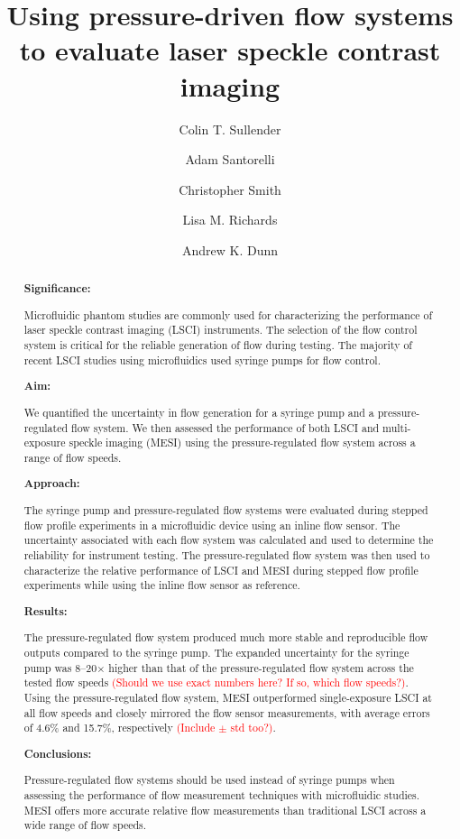 \documentclass[12pt]{spieman}
\title{Using pressure-driven flow systems to evaluate laser speckle contrast imaging}
\author[a]{Colin T. Sullender}
\author[a]{Adam Santorelli}
\author[a]{Christopher Smith}
\author[a]{Lisa M. Richards}
\author[a,*]{Andrew K. Dunn}
\affil[a]{Department of Biomedical Engineering, The University of Texas at Austin, Austin, TX, 78712, USA}
\newcommand{\abstractsection}[1]{
  \par\addvspace{.5\baselineskip}
  \noindent\textbf{#1: }\ignorespaces
}
\begin{document}
\maketitle


\begin{abstract}

\abstractsection{Significance}
Microfluidic phantom studies are commonly used for characterizing the performance of laser speckle contrast imaging (LSCI) instruments. The selection of the flow control system is critical for the reliable generation of flow during testing. The majority of recent LSCI studies using microfluidics used syringe pumps for flow control.

\abstractsection{Aim}
We quantified the uncertainty in flow generation for a syringe pump and a pressure-regulated flow system. We then assessed the performance of both LSCI and multi-exposure speckle imaging (MESI) using the pressure-regulated flow system across a range of flow speeds.

\abstractsection{Approach}
The syringe pump and pressure-regulated flow systems were evaluated during stepped flow profile experiments in a microfluidic device using an inline flow sensor. The uncertainty associated with each flow system was calculated and used to determine the reliability for instrument testing. The pressure-regulated flow system was then used to characterize the relative performance of LSCI and MESI during stepped flow profile experiments while using the inline flow sensor as reference.

\abstractsection{Results}
The pressure-regulated flow system produced much more stable and reproducible flow outputs compared to the syringe pump. The expanded uncertainty for the syringe pump was 8--20$\times$ higher than that of the pressure-regulated flow system across the tested flow speeds \textcolor{red}{(Should we use exact numbers here? If so, which flow speeds?)}. Using the pressure-regulated flow system, MESI outperformed single-exposure LSCI at all flow speeds and closely mirrored the flow sensor measurements, with average errors of 4.6\% and 15.7\%, respectively \textcolor{red}{(Include $\pm$ std too?)}.

\abstractsection{Conclusions}
Pressure-regulated flow systems should be used instead of syringe pumps when assessing the performance of flow measurement techniques with microfluidic studies. MESI offers more accurate relative flow measurements than traditional LSCI across a wide range of flow speeds.

\end{abstract}
\end{document}
